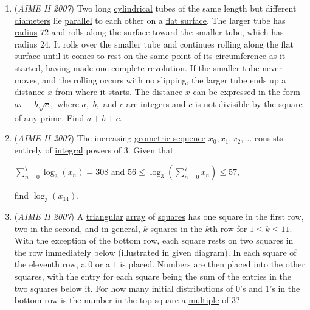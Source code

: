 \begin{enumerate}
	\item (\textit{AIME II 2007}) Two long \href{https://artofproblemsolving.com/wiki/index.php?title=Cylinder}{cylindrical} tubes of the same length but different \href{https://artofproblemsolving.com/wiki/index.php?title=Diameter}{diameters} lie \href{https://artofproblemsolving.com/wiki/index.php?title=Parallel}{parallel} to each other on a \href{https://artofproblemsolving.com/wiki/index.php?title=Plane}{flat surface}. The larger tube has \href{https://artofproblemsolving.com/wiki/index.php?title=Radius}{radius} $72$ and rolls along the surface toward the smaller tube, which has radius $24$. It rolls over the smaller tube and continues rolling along the flat surface until it comes to rest on the same point of its \href{https://artofproblemsolving.com/wiki/index.php?title=Circumference}{circumference} as it started, having made one complete revolution. If the smaller tube never moves, and the rolling occurs with no slipping, the larger tube ends up a \href{https://artofproblemsolving.com/wiki/index.php?title=Distance}{distance} $x$ from where it starts. The distance $x$ can be expressed in the form $a\pi+b\sqrt{c},$ where $a,$ $b,$ and $c$ are \href{https://artofproblemsolving.com/wiki/index.php?title=Integer}{integers} and $c$ is not divisible by the \href{https://artofproblemsolving.com/wiki/index.php?title=Square}{square} of any \href{https://artofproblemsolving.com/wiki/index.php?title=Prime}{prime}. Find $a+b+c.$


	\item (\textit{AIME II 2007}) The increasing \href{https://artofproblemsolving.com/wiki/index.php?title=Geometric\_sequence}{geometric sequence} $x_{0},x_{1},x_{2},\ldots$ consists entirely of \href{https://artofproblemsolving.com/wiki/index.php?title=Integer}{integral} powers of $3.$ Given that


 $\sum_{n=0}^{7}\log_{3}(x_{n}) = 308$ and $56 \leq \log_{3}\left ( \sum_{n=0}^{7}x_{n}\right ) \leq 57,$


 find $\log_{3}(x_{14}).$


	\item (\textit{AIME II 2007}) A \href{https://artofproblemsolving.com/wiki/index.php?title=Triangle}{triangular} \href{https://artofproblemsolving.com/wiki/index.php?title=Array}{array} of \href{https://artofproblemsolving.com/wiki/index.php?title=Square}{squares} has one square in the first row, two in the second, and in general, $k$ squares in the $k$th row for $1 \leq k \leq 11.$ With the exception of the bottom row, each square rests on two squares in the row immediately below (illustrated in given diagram). In each square of the eleventh row, a $0$ or a $1$ is placed. Numbers are then placed into the other squares, with the entry for each square being the sum of the entries in the two squares below it. For how many initial distributions of $0$'s and $1$'s in the bottom row is the number in the top square a \href{https://artofproblemsolving.com/wiki/index.php?title=Multiple}{multiple} of $3$?



\end{enumerate}
